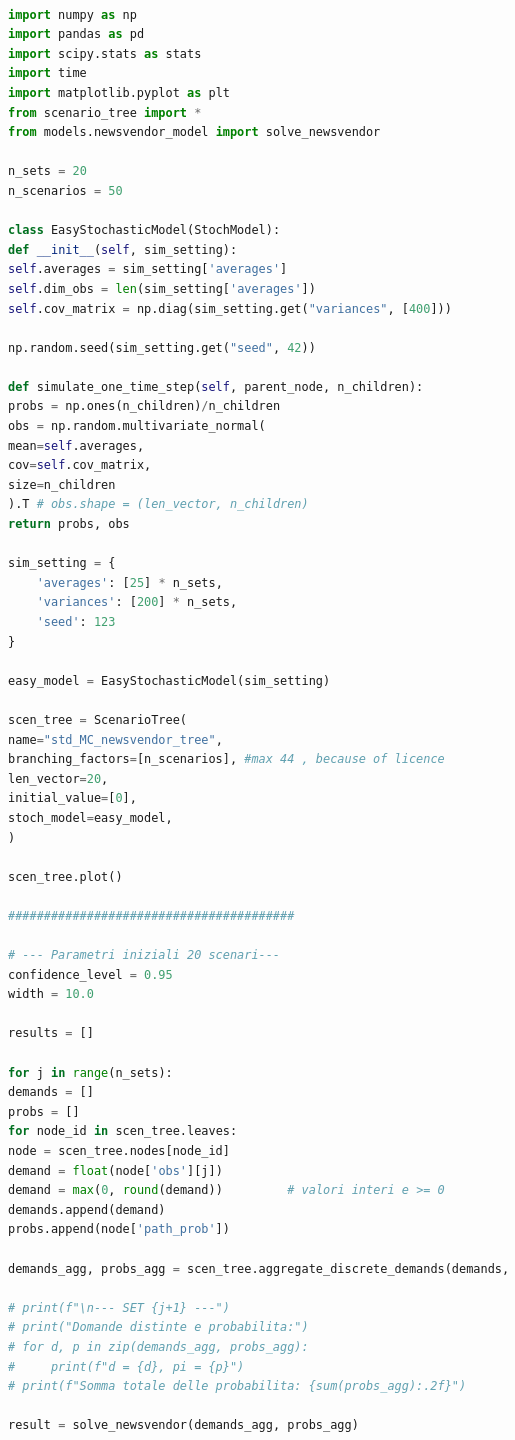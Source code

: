 \documentclass[a4paper,12pt]{article}
\begin{document}
\begin{lstlisting}[language=python,caption={Main of Newvendor problem},label={lst:main-nv}]

import numpy as np
import pandas as pd
import scipy.stats as stats
import time
import matplotlib.pyplot as plt
from scenario_tree import *
from models.newsvendor_model import solve_newsvendor

n_sets = 20           
n_scenarios = 50      

class EasyStochasticModel(StochModel):
def __init__(self, sim_setting):
self.averages = sim_setting['averages']
self.dim_obs = len(sim_setting['averages'])
self.cov_matrix = np.diag(sim_setting.get("variances", [400]))

np.random.seed(sim_setting.get("seed", 42))

def simulate_one_time_step(self, parent_node, n_children):
probs = np.ones(n_children)/n_children
obs = np.random.multivariate_normal(
mean=self.averages,
cov=self.cov_matrix,
size=n_children
).T # obs.shape = (len_vector, n_children)
return probs, obs 

sim_setting = {
	'averages': [25] * n_sets,  
	'variances': [200] * n_sets,
	'seed': 123
}

easy_model = EasyStochasticModel(sim_setting)

scen_tree = ScenarioTree(
name="std_MC_newsvendor_tree",
branching_factors=[n_scenarios], #max 44 , because of licence
len_vector=20,
initial_value=[0],
stoch_model=easy_model,
)

scen_tree.plot()

########################################

# --- Parametri iniziali 20 scenari---
confidence_level = 0.95
width = 10.0

results = []

for j in range(n_sets):
demands = []
probs = []
for node_id in scen_tree.leaves:
node = scen_tree.nodes[node_id]
demand = float(node['obs'][j])         
demand = max(0, round(demand))         # valori interi e >= 0
demands.append(demand)
probs.append(node['path_prob'])

demands_agg, probs_agg = scen_tree.aggregate_discrete_demands(demands, probs)

# print(f"\n--- SET {j+1} ---")
# print("Domande distinte e probabilita:")
# for d, p in zip(demands_agg, probs_agg):
#     print(f"d = {d}, pi = {p}")
# print(f"Somma totale delle probabilita: {sum(probs_agg):.2f}")

result = solve_newsvendor(demands_agg, probs_agg)


\end{lstlisting}
\end{document}

